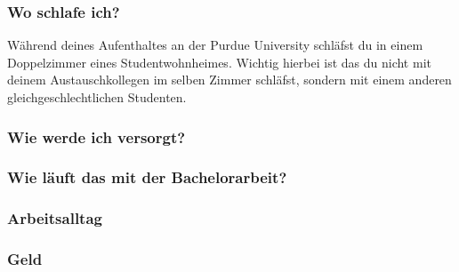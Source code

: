 \documentclass[
  paper=a4,
  fontsize=12pt,
  DIV=16,
  headheight=52pt,
  footheight=45pt,
  headinclude,
  parskip=full,
]{scrartcl}
\begin{document}
\subsubsection*{Wo schlafe ich?}
Während deines Aufenthaltes an der Purdue University schläfst du in einem
Doppelzimmer eines Studentwohnheimes.
Wichtig hierbei ist das du nicht mit deinem Austauschkollegen im selben Zimmer
schläfst, sondern mit einem anderen gleichgeschlechtlichen Studenten.

\subsubsection*{Wie werde ich versorgt?}

\subsubsection*{Wie läuft das mit der Bachelorarbeit?}

\subsubsection*{Arbeitsalltag}

\subsubsection*{Geld}
\end{document}
